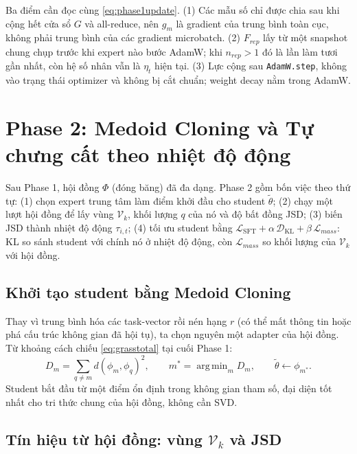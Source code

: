 \documentclass[12pt,a4paper]{article}
\theoremstyle{plain}
\DeclareMathOperator*{\argmin}{arg\,min}
\DeclareMathOperator{\KL}{KL}
\newcommand{\Vk}{\mathcal V_k}
\begin{document}
Ba điểm cần đọc cùng \eqref{eq:phase1update}. (1) Các mẫu số chỉ được chia sau khi cộng hết cửa sổ $G$ và all-reduce, nên $g_m$ là gradient của trung bình toàn cục, không phải trung bình của các gradient microbatch. (2) $F_{rep}$ lấy từ một snapshot chung chụp trước khi expert nào bước AdamW; khi $n_{rep}>1$ đó là lần làm tươi gần nhất, còn hệ số nhân vẫn là $\eta_t$ hiện tại. (3) Lực cộng sau \texttt{AdamW.step}, không vào trạng thái optimizer và không bị cắt chuẩn; weight decay nằm trong AdamW.

\section{Phase 2: Medoid Cloning và Tự chưng cất theo nhiệt độ động}
\label{sec:phase2}

Sau Phase 1, hội đồng $\Phi$ (đóng băng) đã đa dạng. Phase 2 gồm bốn việc theo thứ tự: (1) chọn expert trung tâm làm điểm khởi đầu cho student $\tilde\theta$; (2) chạy một lượt hội đồng để lấy vùng $\Vk$, khối lượng $q$ của nó và độ bất đồng JSD; (3) biến JSD thành nhiệt độ động $\tau_{i,t}$; (4) tối ưu student bằng $\mathcal L_{\mathrm{SFT}}+\alpha\,\mathcal D_{\KL}+\beta\,\mathcal L_{mass}$: KL so sánh student với chính nó ở nhiệt độ động, còn $\mathcal L_{mass}$ so khối lượng của $\Vk$ với hội đồng.

\subsection{Khởi tạo student bằng Medoid Cloning}
\label{sec:medoid}

Thay vì trung bình hóa các task-vector rồi nén hạng $r$ (có thể mất thông tin hoặc phá cấu trúc không gian đã hội tụ), ta chọn nguyên một adapter của hội đồng. Từ khoảng cách chiếu \eqref{eq:grasstotal} tại cuối Phase 1:
\begin{equation}
\label{eq:medoid}
D_m=\sum_{q\ne m}d(\phi_m,\phi_q)^2,\qquad m^*=\argmin_{m}D_m,\qquad \tilde\theta\leftarrow\phi_{m^*}.
\end{equation}
Student bắt đầu từ một điểm ổn định trong không gian tham số, đại diện tốt nhất cho tri thức chung của hội đồng, không cần SVD.

\subsection{Tín hiệu từ hội đồng: vùng $\Vk$ và JSD}
\label{sec:signals}
\end{document}
